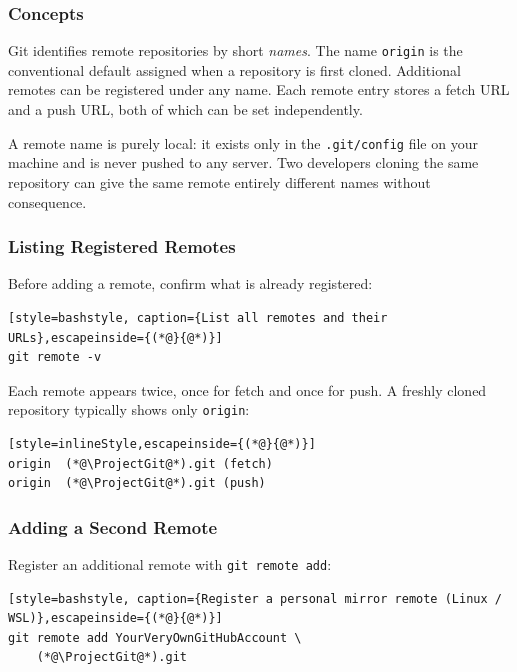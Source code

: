 \subsubsection{Concepts}

Git identifies remote repositories by short \emph{names}. The name
\texttt{origin} is the conventional default assigned when a repository
is first cloned. Additional remotes can be registered under any name.
Each remote entry stores a fetch URL and a push URL, both of which can
be set independently.

\begin{infobox}
A remote name is purely local: it exists only in the
\texttt{.git/config} file on your machine and is never pushed to any
server. Two developers cloning the same repository can give the same
remote entirely different names without consequence.
\end{infobox}

\subsubsection{Listing Registered Remotes}

Before adding a remote, confirm what is already registered:

\begin{lstlisting}[style=bashstyle, caption={List all remotes and their URLs},escapeinside={(*@}{@*)}]
git remote -v
\end{lstlisting}

Each remote appears twice, once for fetch and once for push. A freshly
cloned repository typically shows only \texttt{origin}:

\begin{lstlisting}[style=inlineStyle,escapeinside={(*@}{@*)}]
origin  (*@\ProjectGit@*).git (fetch)
origin  (*@\ProjectGit@*).git (push)
\end{lstlisting}

\subsubsection{Adding a Second Remote}

Register an additional remote with \texttt{git remote add}:

\begin{lstlisting}[style=bashstyle, caption={Register a personal mirror remote (Linux / WSL)},escapeinside={(*@}{@*)}]
git remote add YourVeryOwnGitHubAccount \
    (*@\ProjectGit@*).git
\end{lstlisting}

